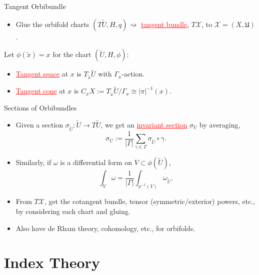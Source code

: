 \documentclass[aspectratio=169,xcolor=dvipsnames]{beamer}
\newcommand{\ra}{\rightarrow}
\newcommand{\w}{\omega}
\begin{document}
\begin{frame}{Tangent Orbibundle}
	\begin{itemize}
		\item Glue the orbifold charts $(T\widetilde{U}, H, q) \rightsquigarrow$ \textcolor{red}{\underline{tangent bundle}}, $T\mathcal{X}$, to $\mathcal{X} = (X, \mathfrak{U})$.
	\end{itemize}
	Let $\phi(\tilde{x}) = x$ for the chart $(\widetilde{U}, H, \phi)$:
	\begin{itemize}
		\item \textcolor{red}{\underline{Tangent space}} at $x$ is $T_{\tilde{x}}\widetilde{U}$ with $\Gamma_{x}$-action.
		\item \textcolor{red}{\underline{Tangent cone}} at $x$ is $C_{x}X := T_{\tilde{x}}\widetilde{U}/\Gamma_{x} \cong |\pi|^{-1}(x)$.
	\end{itemize}
\end{frame}

\begin{frame}{Sections of Orbibundles}
	\begin{itemize}
		\item Given a section $\sigma_{\widetilde{U}} : \widetilde{U} \ra T\widetilde{U}$, we get an \textcolor{red}{\underline{invariant section}} $\sigma_{U}$ by averaging,
		\[
		\sigma_{U} := \frac{1}{|\Gamma|}\sum_{\gamma \in \Gamma} \sigma_{\widetilde{U}} \circ \gamma.
		\]
		\item Similarly, if $\w$ is a differential form on $V \subset \phi(\widetilde{U})$,
		\[
		\int_{V} \w = \frac{1}{|\Gamma|}\int_{\phi^{-1}(V)} \w_{\widetilde{U}}.
		\]
		\item From $T\mathcal{X}$, get the cotangent bundle, tensor (symmetric/exterior) powers, etc., by considering each chart and gluing.
        \item Also have de Rham theory, cohomology, etc., for orbifolds.
	\end{itemize}
\end{frame}

\section{Index Theory}
\end{document}

